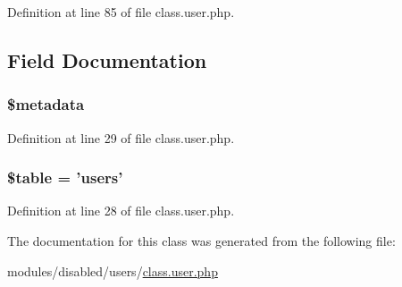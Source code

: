 Definition at line 85 of file class.\-user.\-php.



\subsection{Field Documentation}
\hypertarget{class_user_ae7fc3682b173ad9d4b1892bdc04d18d9}{
\subsubsection[{\$metadata}]{\setlength{\rightskip}{0pt plus 5cm}\$metadata}}\label{class_user_ae7fc3682b173ad9d4b1892bdc04d18d9}


Definition at line 29 of file class.\-user.\-php.

\hypertarget{class_user_ae8876a14058f368335baccf35af4a22b}{
\subsubsection[{\$table}]{\setlength{\rightskip}{0pt plus 5cm}\$table = 'users'}}\label{class_user_ae8876a14058f368335baccf35af4a22b}


Definition at line 28 of file class.\-user.\-php.



The documentation for this class was generated from the following file\-:\begin{DoxyCompactItemize}
\item 
modules/disabled/users/\hyperlink{class_8user_8php}{class.\-user.\-php}\end{DoxyCompactItemize}
